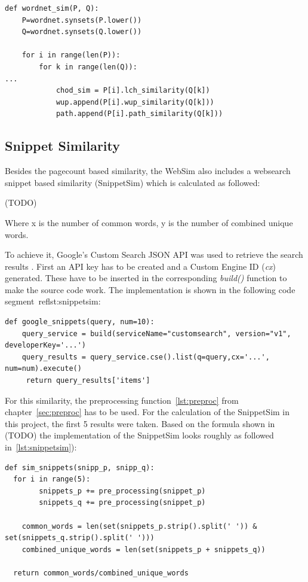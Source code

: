 \documentclass[conference]{IEEEtran}
\begin{document}
\begin{lstlisting}[frame=single, label=lst:wup, caption={Use of WUP, PATH and LCH}, captionpos=b]
def wordnet_sim(P, Q):
    P=wordnet.synsets(P.lower())
    Q=wordnet.synsets(Q.lower())

    for i in range(len(P)):
        for k in range(len(Q)):
...
            chod_sim = P[i].lch_similarity(Q[k])
            wup.append(P[i].wup_similarity(Q[k]))
            path.append(P[i].path_similarity(Q[k]))
\end{lstlisting}

\subsection{Snippet Similarity}\label{subsec:wup}

Besides the pagecount based similarity, the WebSim also includes a websearch snippet based similarity (SnippetSim) which is calculated as followed:

(TODO)

Where x is the number of common words, y is the number of combined unique words.

To achieve it, Google's Custom Search JSON API was used to retrieve the search results \cite{customsearch}. First an API key has to be created \cite{customsearch} and a Custom Engine ID (\textit{cx}) generated. These have to be inserted in the corresponding \textit{build()} function to make the source code work. The implementation is shown in the following code segment~ref{lst:snippetsim}:

\begin{lstlisting}[frame=single, label=lst:snippetsim, caption={Connection to Google Search API}, captionpos=b]
def google_snippets(query, num=10):
    query_service = build(serviceName="customsearch", version="v1", developerKey='...') 
    query_results = query_service.cse().list(q=query,cx='...', num=num).execute()
     return query_results['items']
\end{lstlisting}

For this similarity, the preprocessing function~\ref{lst:preproc} from chapter~\ref{sec:preproc} has to be used. For the calculation of the SnippetSim in this project, the first 5 results were taken. Based on the formula shown in (TODO) the implementation of the SnippetSim looks roughly as followed in~\ref{lst:snippetsim}):

\begin{lstlisting}[frame=single, label=lst:snippetsim, caption={Connection to Google Search API}, captionpos=b]
def sim_snippets(snipp_p, snipp_q):
  for i in range(5):
        snippets_p += pre_processing(snippet_p)     
        snippets_q += pre_processing(snippet_p)
    
    common_words = len(set(snippets_p.strip().split(' ')) & set(snippets_q.strip().split(' '))) 
    combined_unique_words = len(set(snippets_p + snippets_q))
    
  return common_words/combined_unique_words
\end{lstlisting}
\end{document}
